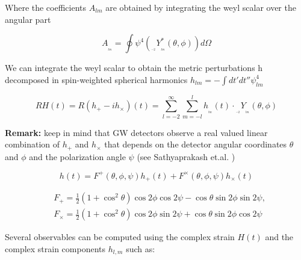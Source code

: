 Where the coefficients $A_{lm}$ are obtained by integrating the weyl scalar over the angular  part

\begin{equation}
A_{_{_{lm}}} = \oint \psi^4({}_{_{_{-2}}}Y^{*}_{_{_{lm}}}(\theta, \phi)) d\Omega
\end{equation}

We can integrate the weyl scalar to obtain the metric perturbations h decomposed in spin-weighted spherical harmonics
$ h_{lm} = - \int dt' dt'' \psi_{lm}^4$
 
\begin{equation}\label{fvr}
RH(t) = R(h_+ - ih_{\times})(t) = \sum_{l=-2}^{\infty}  \sum_{m=-l}^{l} h_{_{_{lm}}}(t) \cdot {}_{_{_{-2}}}Y_{_{_{lm}}}(\theta, \phi)
\end{equation}

\begin{mdframed}
\textbf{Remark:} keep in mind that  GW detectors observe a real valued linear combination of $h_+$ and $h_\times$ that depends on the detector angular coordinates $\theta$ and $\phi$  and the polarization angle $\psi$ (see Sathyaprakash et.al. \cite[section 4.2.1]{Sathyaprakash:2009xs})

\begin{equation}
h(t) = F^{+}(\theta, \phi, \psi) h_+(t) + F^{\times}(\theta, \phi, \psi) h_{\times}(t)
\end{equation}

\begin{equation}
\begin{aligned}
& F_{+}=\frac{1}{2}\left(1+\cos ^2 \theta\right) \cos 2 \phi \cos 2 \psi-\cos \theta \sin 2 \phi \sin 2 \psi, \\
& F_{\times}=\frac{1}{2}\left(1+\cos ^2 \theta\right) \cos 2 \phi \sin 2 \psi+\cos \theta \sin 2 \phi \cos 2 \psi
\end{aligned}
\end{equation}
\end{mdframed}


Several observables can be computed using the complex strain $H(t)$ and the complex strain components $h_{l,m}$ such as:

